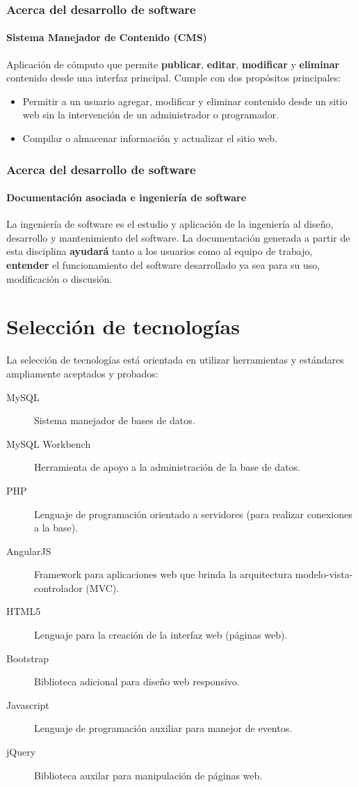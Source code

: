 \documentclass{beamer}
\begin{document}
\begin{frame}
	\frametitle{Acerca del desarrollo de software}
	\framesubtitle{Sistema Manejador de Contenido (CMS)}
	Aplicación de cómputo que permite \textbf{publicar}, \textbf{editar}, \textbf{modificar} y \textbf{eliminar} contenido desde una interfaz principal. Cumple con dos propósitos principales:
	\begin{itemize}
		\item Permitir a un usuario agregar, modificar y eliminar contenido desde un sitio web sin la intervención de un administrador o programador.
		\item Compilar o almacenar información y actualizar el sitio web.
	\end{itemize}
\end{frame}

\begin{frame}
	\frametitle{Acerca del desarrollo de software}
	\framesubtitle{Documentación asociada e ingeniería de software}
	La ingeniería de software es el estudio y aplicación de la ingeniería al diseño, desarrollo y mantenimiento del software. La documentación generada a partir de esta disciplina \textbf{ayudará} tanto a los usuarios como al equipo de trabajo, \textbf{entender} el funcionamiento del software desarrollado ya sea para su uso, modificación o discusión.
\end{frame}

\section{Selección de tecnologías}
\begin{frame}
	La selección de tecnologías está orientada en utilizar herramientas y estándares ampliamente aceptados y probados:
	\begin{description}
		\item[MySQL] Sistema manejador de bases de datos.
		\item[MySQL Workbench] Herramienta de apoyo a la administración de la base de datos.
		\item[PHP] Lenguaje de programación orientado a servidores (para realizar conexiones a la base).
		\item[AngularJS] Framework para aplicaciones web que brinda la arquitectura modelo-vista-controlador (MVC).
		\item[HTML5] Lenguaje para la creación de la interfaz web (páginas web).
		\item[Bootstrap] Biblioteca adicional para diseño web responsivo.
		\item[Javascript] Lenguaje de programación auxiliar para manejor de eventos.
		\item[jQuery] Biblioteca auxilar para manipulación de páginas web.
	\end{description}
\end{frame}
\end{document}
